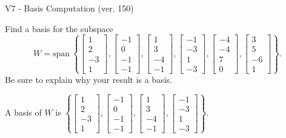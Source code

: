 \begin{exercise}
  \begin{exerciseTitle}V7 - Basis Computation (ver. 150)\end{exerciseTitle}
  \begin{exerciseStatement}
    Find a basis for the subspace 
\[W=\mathrm{span}\ \left\{\left[\begin{array}{r}
1 \\
2 \\
-3 \\
1
\end{array}\right] , \left[\begin{array}{r}
-1 \\
0 \\
-1 \\
-1
\end{array}\right] , \left[\begin{array}{r}
1 \\
3 \\
-4 \\
-1
\end{array}\right] , \left[\begin{array}{r}
-1 \\
-3 \\
1 \\
-3
\end{array}\right] , \left[\begin{array}{r}
-4 \\
-4 \\
7 \\
0
\end{array}\right] , \left[\begin{array}{r}
3 \\
5 \\
-6 \\
1
\end{array}\right]\right\}.\]
 Be sure to explain why your result is a basis.


  \end{exerciseStatement}
  \begin{exerciseAnswer}
   A basis of \(W\) is  \(\left\{\left[\begin{array}{r}
1 \\
2 \\
-3 \\
1
\end{array}\right] , \left[\begin{array}{r}
-1 \\
0 \\
-1 \\
-1
\end{array}\right] , \left[\begin{array}{r}
1 \\
3 \\
-4 \\
-1
\end{array}\right] , \left[\begin{array}{r}
-1 \\
-3 \\
1 \\
-3
\end{array}\right]\right\}\).
  


  \end{exerciseAnswer}
\end{exercise}